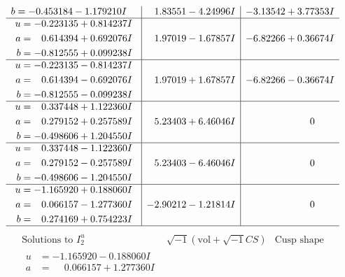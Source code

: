 \documentclass[1p]{elsarticle_modified}
\theoremstyle{definition}
\newcommand{\I}{\sqrt{-1}}
\begin{document}
$$\begin{array}{c|c|c}
\begin{aligned}
b &= -0.453184 - 1.179210 I\end{aligned}
 & \phantom{-}1.83551 - 4.24996 I & -3.13542 + 3.77353 I \\ \hline\begin{aligned}
u &= -0.223135 + 0.814237 I \\
a &= \phantom{-}0.614394 + 0.692076 I \\
b &= -0.812555 + 0.099238 I\end{aligned}
 & \phantom{-}1.97019 - 1.67857 I & -6.82266 + 0.36674 I \\ \hline\begin{aligned}
u &= -0.223135 - 0.814237 I \\
a &= \phantom{-}0.614394 - 0.692076 I \\
b &= -0.812555 - 0.099238 I\end{aligned}
 & \phantom{-}1.97019 + 1.67857 I & -6.82266 - 0.36674 I \\ \hline\begin{aligned}
u &= \phantom{-}0.337448 + 1.122360 I \\
a &= \phantom{-}0.279152 + 0.257589 I \\
b &= -0.498606 + 1.204550 I\end{aligned}
 & \phantom{-}5.23403 + 6.46046 I & \phantom{-0.000000 } 0 \\ \hline\begin{aligned}
u &= \phantom{-}0.337448 - 1.122360 I \\
a &= \phantom{-}0.279152 - 0.257589 I \\
b &= -0.498606 - 1.204550 I\end{aligned}
 & \phantom{-}5.23403 - 6.46046 I & \phantom{-0.000000 } 0 \\ \hline\begin{aligned}
u &= -1.165920 + 0.188060 I \\
a &= \phantom{-}0.066157 - 1.277360 I \\
b &= \phantom{-}0.274169 + 0.754223 I\end{aligned}
 & -2.90212 - 1.21814 I & \phantom{-0.000000 } 0\\
 \hline 
 \end{array}$$\newpage$$\begin{array}{c|c|c}  
\text{Solutions to }I^u_{2}& \I (\text{vol} + \sqrt{-1}CS) & \text{Cusp shape}\\
 \hline 
\begin{aligned}
u &= -1.165920 - 0.188060 I \\
a &= \phantom{-}0.066157 + 1.277360 I \\

\end{aligned}
\end{array}$$
\end{document}

